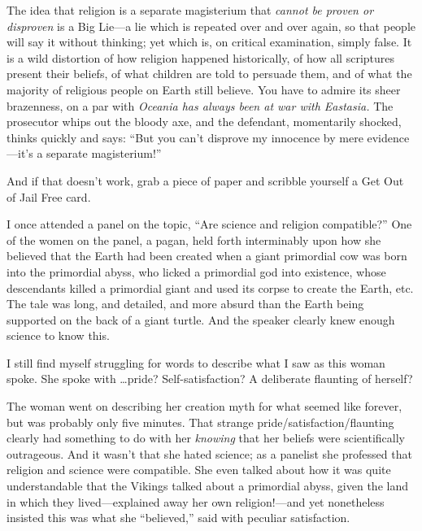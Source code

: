 {
 The idea that religion is a separate magisterium that
\textit{cannot be proven or disproven} is a Big Lie---a lie which is
repeated over and over again, so that people will say it without
thinking; yet which is, on critical examination, simply false. It is a
wild distortion of how religion happened historically, of how all
scriptures present their beliefs, of what children are told to persuade
them, and of what the majority of religious people on Earth still
believe. You have to admire its sheer brazenness, on a par with
\textit{Oceania has always been at war with Eastasia.} The prosecutor
whips out the bloody axe, and the defendant, momentarily shocked,
thinks quickly and says: ``But you
can't disprove my innocence by mere
evidence---it's a separate
magisterium!''}

{
 And if that doesn't work, grab a piece of paper
and scribble yourself a Get Out of Jail Free card.}

\myendsectiontext


{
 I once attended a panel on the topic, ``Are
science and religion compatible?'' One of the women
on the panel, a pagan, held forth interminably upon how she believed
that the Earth had been created when a giant primordial cow was born
into the primordial abyss, who licked a primordial god into existence,
whose descendants killed a primordial giant and used its corpse to
create the Earth, etc. The tale was long, and detailed, and more absurd
than the Earth being supported on the back of a giant turtle. And the
speaker clearly knew enough science to know this. }

{
 I still find myself struggling for words to describe what I saw as
this woman spoke. She spoke with \ldots pride? Self-satisfaction? A
deliberate flaunting of herself?}

{
 The woman went on describing her creation myth for what seemed
like forever, but was probably only five minutes. That strange
pride/satisfaction/flaunting clearly had something to do with her
\textit{knowing} that her beliefs were scientifically outrageous. And
it wasn't that she hated science; as a panelist she
professed that religion and science were compatible. She even talked
about how it was quite understandable that the Vikings talked about a
primordial abyss, given the land in which they lived---explained away
her own religion!---and yet nonetheless insisted this was what she
``believed,'' said with peculiar
satisfaction.}

